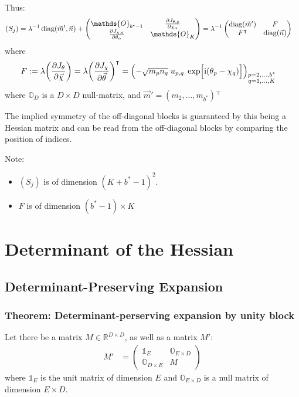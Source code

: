 \documentclass[
	english,
	a4paper,
	fontsize=10pt,
	parskip=half,
	titlepage=true,
	DIV=12,
	final
]{scrreprt}
\newcommand*{\transp}{\ensuremath{^\intercal}}
\newcommand*{\iunit}{\ensuremath{\mathrm{i}}}
\newcommand*{\setReals}    {\ensuremath{\mathbb{R}}}
\DeclareMathOperator{\diag}{diag}
\begin{document}
Thus:
\begin{align}
	(S_j)
&=
	\lambda^{-1}
	\diag(\vec{m}', \vec{n})
	+
	\begin{pmatrix}
		\mathds{O}_{b^*-1} & 
		\pdv{J_{\theta, p}}{\chi_{\alpha}}
		\\
		\pdv{J_{\chi, q}}{\theta_{\alpha}} &
		\mathds{O}_{K}
	\end{pmatrix}
=
	\lambda^{-1}
	\begin{pmatrix}
		\diag(\vec{m}') & F 			\\
		F\transp & \diag(\vec{n})
	\end{pmatrix}
\end{align}
where
\begin{align}
	F
&:=
	\lambda \qty( \pdv{J_{\theta}}{\vec{\chi}} ) 
	= \lambda \qty( \pdv{J_{\chi}}{\vec{\theta}} )\transp
	= \qty( -\sqrt{m_p n_q} \; u_{p,q} \; \exp[\Big. \iunit(\theta_p - \chi_q)] )_{
		\substack{p = 2, \ldots, b^* \\ q = 1, \ldots, K}
	}	
\end{align}
where $\mathds{O}_{D}$ is a $D \times D$ null-matrix, and $\vec{m}' = (m_2, \ldots, m_{b^*})\transp$

The implied symmetry of the off-diagonal blocks is guaranteed by this being a Hessian matrix and can be read from the off-diagonal blocks by comparing the position of indices.

Note:
\begin{itemize}
\item $(S_j)$ is of dimension $(K + b^* - 1)^{2}$.
\item $F$ is of dimension $(b^* - 1) \times K$
\end{itemize}

\section{Determinant of the Hessian}
\subsection{Determinant-Preserving Expansion}
\subsubsection{Theorem: Determinant-perserving expansion by unity block}
Let there be a matrix $M \in \setReals^{D \times D}$, as well as a matrix $M'$:
\begin{align}
	M'
&=
	\begin{pmatrix}
		\mathds{1}_{E} & \mathds{O}_{E \times D} \\
		\mathds{O}_{D \times E} & M
	\end{pmatrix}
\end{align}
where $\mathds{1}_{E}$ is the unit matrix of dimension $E$ and $\mathds{O}_{E \times D}$ is a null matrix of dimension $E \times D$.
\end{document}
